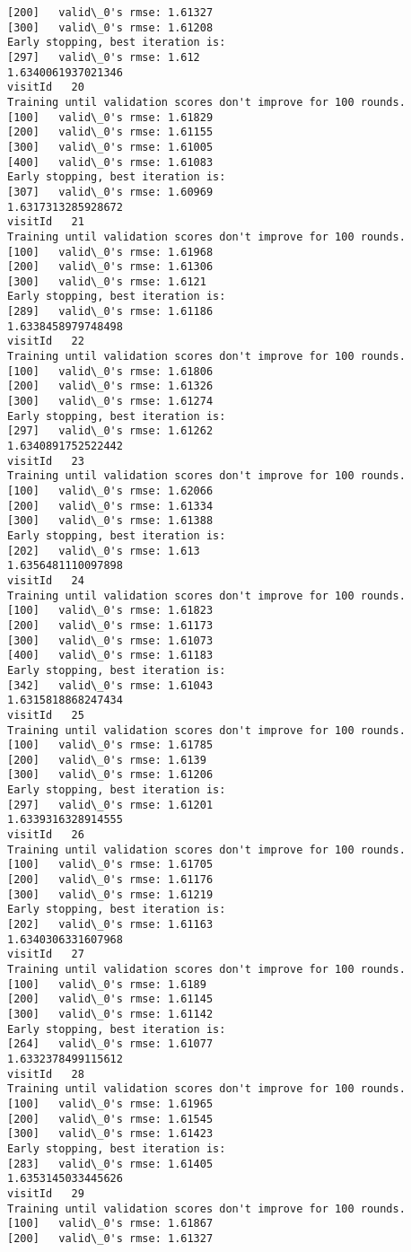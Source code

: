 \documentclass[11pt]{article}
\begin{document}
\begin{Verbatim}[commandchars=\\\{\}]
[200]	valid\_0's rmse: 1.61327
[300]	valid\_0's rmse: 1.61208
Early stopping, best iteration is:
[297]	valid\_0's rmse: 1.612
1.6340061937021346
visitId   20
Training until validation scores don't improve for 100 rounds.
[100]	valid\_0's rmse: 1.61829
[200]	valid\_0's rmse: 1.61155
[300]	valid\_0's rmse: 1.61005
[400]	valid\_0's rmse: 1.61083
Early stopping, best iteration is:
[307]	valid\_0's rmse: 1.60969
1.6317313285928672
visitId   21
Training until validation scores don't improve for 100 rounds.
[100]	valid\_0's rmse: 1.61968
[200]	valid\_0's rmse: 1.61306
[300]	valid\_0's rmse: 1.6121
Early stopping, best iteration is:
[289]	valid\_0's rmse: 1.61186
1.6338458979748498
visitId   22
Training until validation scores don't improve for 100 rounds.
[100]	valid\_0's rmse: 1.61806
[200]	valid\_0's rmse: 1.61326
[300]	valid\_0's rmse: 1.61274
Early stopping, best iteration is:
[297]	valid\_0's rmse: 1.61262
1.6340891752522442
visitId   23
Training until validation scores don't improve for 100 rounds.
[100]	valid\_0's rmse: 1.62066
[200]	valid\_0's rmse: 1.61334
[300]	valid\_0's rmse: 1.61388
Early stopping, best iteration is:
[202]	valid\_0's rmse: 1.613
1.6356481110097898
visitId   24
Training until validation scores don't improve for 100 rounds.
[100]	valid\_0's rmse: 1.61823
[200]	valid\_0's rmse: 1.61173
[300]	valid\_0's rmse: 1.61073
[400]	valid\_0's rmse: 1.61183
Early stopping, best iteration is:
[342]	valid\_0's rmse: 1.61043
1.6315818868247434
visitId   25
Training until validation scores don't improve for 100 rounds.
[100]	valid\_0's rmse: 1.61785
[200]	valid\_0's rmse: 1.6139
[300]	valid\_0's rmse: 1.61206
Early stopping, best iteration is:
[297]	valid\_0's rmse: 1.61201
1.6339316328914555
visitId   26
Training until validation scores don't improve for 100 rounds.
[100]	valid\_0's rmse: 1.61705
[200]	valid\_0's rmse: 1.61176
[300]	valid\_0's rmse: 1.61219
Early stopping, best iteration is:
[202]	valid\_0's rmse: 1.61163
1.6340306331607968
visitId   27
Training until validation scores don't improve for 100 rounds.
[100]	valid\_0's rmse: 1.6189
[200]	valid\_0's rmse: 1.61145
[300]	valid\_0's rmse: 1.61142
Early stopping, best iteration is:
[264]	valid\_0's rmse: 1.61077
1.6332378499115612
visitId   28
Training until validation scores don't improve for 100 rounds.
[100]	valid\_0's rmse: 1.61965
[200]	valid\_0's rmse: 1.61545
[300]	valid\_0's rmse: 1.61423
Early stopping, best iteration is:
[283]	valid\_0's rmse: 1.61405
1.6353145033445626
visitId   29
Training until validation scores don't improve for 100 rounds.
[100]	valid\_0's rmse: 1.61867
[200]	valid\_0's rmse: 1.61327

\end{Verbatim}
\end{document}
